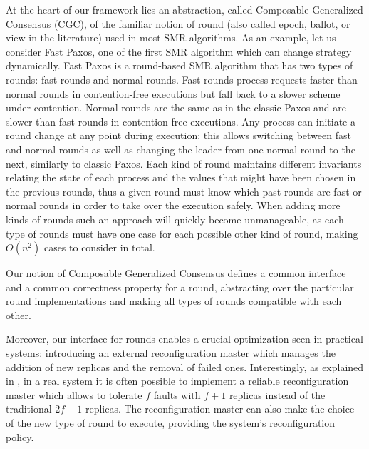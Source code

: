 At the heart of our framework lies an abstraction, called Composable Generalized
Consensus (CGC), of the familiar notion of round (also called epoch, ballot, or
view in the literature) used in most SMR algorithms. As an example, let us
consider Fast Paxos, one of the first SMR algorithm which can change strategy
dynamically. Fast Paxos is a round-based SMR algorithm that has two types of
rounds: fast rounds and normal rounds. Fast rounds process requests faster
than normal rounds in contention-free executions but fall back to a slower
scheme under contention. Normal rounds are the same as in the classic Paxos
and are slower than fast rounds in contention-free executions. Any process can
initiate a round change at any point during execution: this allows switching
between fast and normal rounds as well as changing the leader from one normal
round to the next, similarly to classic Paxos. Each kind of round maintains
different invariants relating the state of each process and the values that
might have been chosen in the previous rounds, thus a given round must know
which past rounds are fast or normal rounds in order to take over the execution
safely. When adding more kinds of rounds such an approach will quickly become
unmanageable, as each type of rounds must have one case for each possible other
kind of round, making $O(n^2)$ cases to consider in total.

Our notion of Composable Generalized Consensus defines a common interface and a
common correctness property for a round, abstracting over the particular round
implementations and making all types of rounds compatible with each other.

Moreover, our interface for rounds enables a crucial optimization seen in
practical systems: introducing an external reconfiguration master which manages
the addition of new replicas and the removal of failed ones. Interestingly, as
explained in \cite{LamportMalkhiZhou09VerticalPaxosPrimarybackupReplication},
in a real system it is often possible to implement a reliable reconfiguration
master which allows to tolerate $f$ faults with $f+1$ replicas instead of the
traditional $2f+1$ replicas. The reconfiguration master can also make the choice
of the new type of round to execute, providing the system's reconfiguration
policy.
